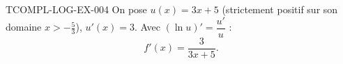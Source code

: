 \begin{corrige}{TCOMPL-LOG-EX-004}
On pose $u(x)=3x+5$ (strictement positif sur son domaine $x>-\frac{5}{3}$), $u'(x)=3$. Avec $(\ln u)' = \dfrac{u'}{u}$ :
\[
  f'(x) = \frac{3}{3x+5}.
\]
\end{corrige}
